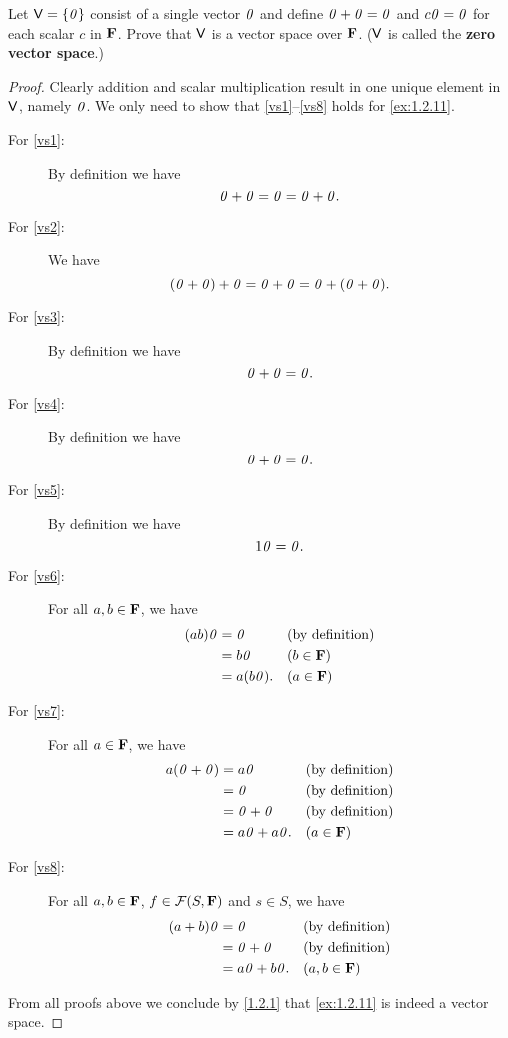 \begin{ex}\label{ex:1.2.11}
  Let \(\mathsf{V} = \left\lbrace\mathit{0}\right\rbrace\) consist of a single vector \(\mathit{0}\) and define \(\mathit{0} + \mathit{0} = \mathit{0}\) and \(c\mathit{0} = \mathit{0}\) for each scalar \(c\) in \(\mathbf{F}\).
  Prove that \(\mathsf{V}\) is a vector space over \(\mathbf{F}\).
  (\(\mathsf{V}\) is called the \textbf{zero vector space}.)
\end{ex}

\begin{proof}
  Clearly addition and scalar multiplication result in one unique element in \(\mathsf{V}\), namely \(\mathit{0}\).
  We only need to show that \ref{vs1}--\ref{vs8} holds for \cref{ex:1.2.11}.
  \begin{description}
    \item[For \ref{vs1}:]
      By definition we have
      \[
        \mathit{0} + \mathit{0} = \mathit{0} = \mathit{0} + \mathit{0}.
      \]
    \item[For \ref{vs2}:]
      We have
      \[
        \p{\zv + \zv} + \zv = \zv + \zv = \zv + \p{\zv + \zv}.
      \]
    \item[For \ref{vs3}:]
      By definition we have
      \[
        \mathit{0} + \mathit{0} = \mathit{0}.
      \]
    \item[For \ref{vs4}:]
      By definition we have
      \[
        \mathit{0} + \mathit{0} = \mathit{0}.
      \]
    \item[For \ref{vs5}:]
      By definition we have
      \[
        1\mathit{0} = \mathit{0}.
      \]
    \item[For \ref{vs6}:]
      For all \(a, b \in \mathbf{F}\), we have
      \begin{align*}
        \p{ab} \zv & = \zv        &  & \text{(by definition)} \\
                   & = b\zv       &  & (b \in \F)             \\
                   & = a\p{b\zv}. &  & (a \in \F)
      \end{align*}
    \item[For \ref{vs7}:]
      For all \(a \in \mathbf{F}\), we have
      \begin{align*}
        a\p{\zv + \zv} & = a\zv         &  & \text{(by definition)} \\
                       & = \zv          &  & \text{(by definition)} \\
                       & = \zv + \zv    &  & \text{(by definition)} \\
                       & = a\zv + a\zv. &  & (a \in \F)
      \end{align*}
    \item[For \ref{vs8}:]
      For all \(a, b \in \mathbf{F}\), \(f \in \FS\) and \(s \in S\), we have
      \begin{align*}
        \p{a + b} \zv & = \zv          &  & \text{(by definition)} \\
                      & = \zv + \zv    &  & \text{(by definition)} \\
                      & = a\zv + b\zv. &  & (a, b \in \F)
      \end{align*}
  \end{description}
  From all proofs above we conclude by \cref{1.2.1} that \cref{ex:1.2.11} is indeed a vector space.
\end{proof}

